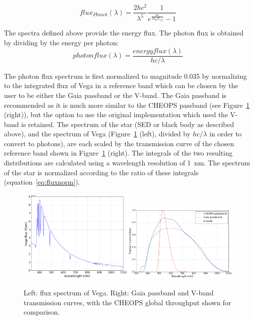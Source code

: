 \documentclass[11pt]{article}      %
\def\HCode#1{}
\def\htmlanchor#1{\HCode{<a id="#1"></a>}}
\begin{document}
\begin{equation}
flux_{Planck}(\lambda) = \frac{2hc^2}{\lambda^5}\frac{1}{e^{\frac{hc}{\lambda k_B T_{eff}}}-1}
\label{eq:planck}
\end{equation}

The spectra defined above provide the energy flux. The photon flux is obtained by dividing by the energy per photon:
$$photonflux(\lambda)=\frac{energyflux(\lambda)}{hc/\lambda}$$

\htmlanchor{passband}
The photon flux spectrum is first normalized to magnitude 0.035 by normalizing to the integrated flux of Vega in a reference band which can be chosen by the user to be either the Gaia passband or the V-band. The Gaia passband is recommended as it is much more similar to the CHEOPS passband (see Figure~\ref{fig:fluxnorm} (right)), but the option to use the original implementation which used the V-band is retained. The spectrum of the star (SED or black body as described above), and the spectrum of Vega (Figure~\ref{fig:fluxnorm} (left), divided by $hc/\lambda$ in order to convert to photons), are each scaled by the transmission curve of the chosen reference band shown in Figure~\ref{fig:fluxnorm} (right).  The integrals of the two resulting distributions are calculated using a wavelength resolution of 1~nm.  The spectrum of the star is normalized according to the ratio of these integrals (equation~\ref{eq:fluxnorm}).

\begin{figure}[hbtp]
  \begin{center}
    \includegraphics[width=0.5\textwidth]{Vega.png}\includegraphics[width=0.5\textwidth]{passbands_May2020.png}
    \caption{Left: flux spectrum of Vega. Right: Gaia passband and V-band transmission curves, with the CHEOPS global throughput shown for comparison.}
    \label{fig:fluxnorm}
  \end{center}
\end{figure}
\end{document}
